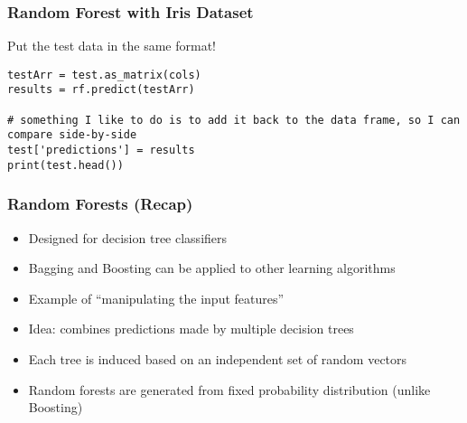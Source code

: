 \begin{frame}[fragile]\frametitle{Random Forest with Iris Dataset}
Put the test data in the same format!
\begin{lstlisting}
testArr = test.as_matrix(cols)
results = rf.predict(testArr)

# something I like to do is to add it back to the data frame, so I can compare side-by-side
test['predictions'] = results
print(test.head())
\end{lstlisting}
\end{frame}

\begin{frame}[fragile]\frametitle{Random Forests (Recap)}
\begin{itemize}
\item Designed for decision tree classifiers
\item Bagging and Boosting can be applied to other learning algorithms
\item Example of ``manipulating the input features'' 
\item Idea: combines predictions made by multiple decision trees
\item Each tree is induced based on an independent set of random vectors
\item Random forests are generated from fixed probability distribution (unlike Boosting)

\end{itemize}
\end{frame}